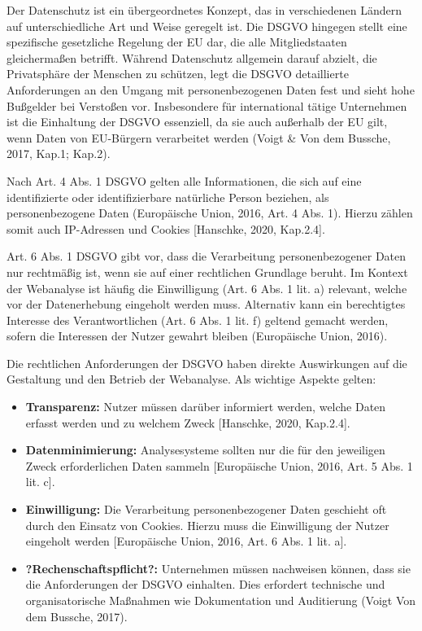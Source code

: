 Der Datenschutz ist ein übergeordnetes Konzept, das in verschiedenen Ländern auf unterschiedliche Art und Weise geregelt ist. Die DSGVO hingegen stellt eine spezifische gesetzliche Regelung der EU dar, die alle Mitgliedstaaten gleichermaßen betrifft. Während Datenschutz allgemein darauf abzielt, die Privatsphäre der Menschen zu schützen, legt die DSGVO detaillierte Anforderungen an den Umgang mit personenbezogenen Daten fest und sieht hohe Bußgelder bei Verstoßen vor. Insbesondere für international tätige Unternehmen ist die Einhaltung der DSGVO essenziell, da sie auch außerhalb der EU gilt, wenn Daten von EU-Bürgern verarbeitet werden (Voigt \& Von dem Bussche, 2017, Kap.1; Kap.2).

Nach Art. 4 Abs. 1 DSGVO gelten alle Informationen, die sich auf eine identifizierte oder identifizierbare natürliche Person beziehen, als personenbezogene Daten (Europäische Union, 2016, Art. 4 Abs. 1). Hierzu zählen somit auch IP-Adressen und Cookies [Hanschke, 2020, Kap.2.4].

Art. 6 Abs. 1 DSGVO gibt vor, dass die Verarbeitung personenbezogener Daten nur rechtmäßig ist, wenn sie auf einer rechtlichen Grundlage beruht. Im Kontext der Webanalyse ist häufig die Einwilligung (Art. 6 Abs. 1 lit. a) relevant, welche vor der Datenerhebung eingeholt werden muss. Alternativ kann ein berechtigtes Interesse des Verantwortlichen (Art. 6 Abs. 1 lit. f) geltend gemacht werden, sofern die Interessen der Nutzer gewahrt bleiben (Europäische Union, 2016).

Die rechtlichen Anforderungen der DSGVO haben direkte Auswirkungen auf die Gestaltung und den Betrieb der Webanalyse. Als wichtige Aspekte gelten: 

\begin{itemize}
    \item \textbf{Transparenz:} Nutzer müssen darüber informiert werden, welche Daten erfasst werden und zu welchem Zweck [Hanschke, 2020, Kap.2.4].
    \item \textbf{Datenminimierung:} Analysesysteme sollten nur die für den jeweiligen Zweck erforderlichen Daten sammeln [Europäische Union, 2016, Art. 5 Abs. 1 lit. c].
    \item \textbf{Einwilligung:} Die Verarbeitung personenbezogener Daten geschieht oft durch den Einsatz von Cookies. Hierzu muss die Einwilligung der Nutzer eingeholt werden [Europäische Union, 2016, Art. 6 Abs. 1 lit. a]. 
    \item \textbf{?Rechenschaftspflicht?:} Unternehmen müssen nachweisen können, dass sie die Anforderungen der DSGVO einhalten. Dies erfordert technische und organisatorische Maßnahmen wie Dokumentation und Auditierung (Voigt Von dem Bussche, 2017).
\end{itemize}

